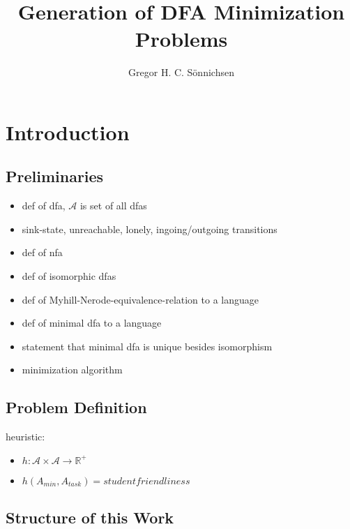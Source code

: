 \documentclass[a4paper, oneside, 11pt]{report}
\title{Generation of DFA Minimization Problems}
\author{Gregor H. C. Sönnichsen}
\begin{document}
\maketitle



\tableofcontents

\chapter{Introduction}

\section{Preliminaries}

\begin{itemize}
	\item def of dfa, $\mathcal{A}$ is set of all dfas
	\item sink-state, unreachable, lonely, ingoing/outgoing transitions
	\item def of nfa
	\item def of isomorphic dfas
	\item def of Myhill-Nerode-equivalence-relation to a language
	\item def of minimal dfa to a language
	\item statement that minimal dfa is unique besides isomorphism
	\item minimization algorithm
\end{itemize}

\section{Problem Definition}

heuristic:
\begin{itemize}
	\item $h \colon \mathcal{A} \times \mathcal{A} \to \mathbb{R^+}$
	\item $h(A_{min}, A_{task}) = studentfriendliness$
\end{itemize}

\section{Structure of this Work}
\end{document}
